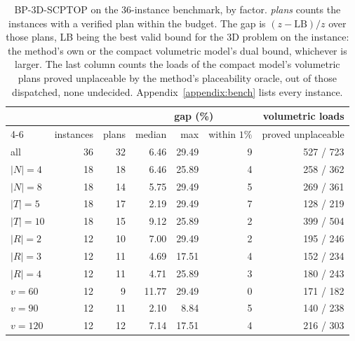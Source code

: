 \begin{table}[!htbp]
\centering
\small
\caption{BP-3D-SCPTOP on the 36-instance benchmark, by factor.
\emph{plans} counts the instances with a verified plan within the
budget. The gap is $(z-\mathrm{LB})/z$ over those plans, LB being the
best valid bound for the 3D problem on the instance: the method's own
or the compact volumetric model's dual bound, whichever is larger. The
last column counts the loads of the compact model's volumetric plans
proved unplaceable by the method's placeability oracle, out of those
dispatched, none undecided. Appendix~\ref{appendix:bench} lists every
instance.}
\label{tab:bench}
\begin{tabular}{lrrrrrr}
\toprule
 & & & \multicolumn{3}{c}{gap (\%)} & volumetric loads \\
\cmidrule(lr){4-6}
 & instances & plans & median & max & within $1\%$ & proved unplaceable \\
\midrule
all       & 36 & 32 & 6.46  & 29.49 & 9 & 527 / 723 \\
\midrule
$|N|=4$   & 18 & 18 & 6.46  & 25.89 & 4 & 258 / 362 \\
$|N|=8$   & 18 & 14 & 5.75  & 29.49 & 5 & 269 / 361 \\
$|T|=5$   & 18 & 17 & 2.19  & 29.49 & 7 & 128 / 219 \\
$|T|=10$  & 18 & 15 & 9.12  & 25.89 & 2 & 399 / 504 \\
$|R|=2$   & 12 & 10 & 7.00  & 29.49 & 2 & 195 / 246 \\
$|R|=3$   & 12 & 11 & 4.69  & 17.51 & 4 & 152 / 234 \\
$|R|=4$   & 12 & 11 & 4.71  & 25.89 & 3 & 180 / 243 \\
$v=60$    & 12 &  9 & 11.77 & 29.49 & 0 & 171 / 182 \\
$v=90$    & 12 & 11 & 2.10  & 8.84  & 5 & 140 / 238 \\
$v=120$   & 12 & 12 & 7.14  & 17.51 & 4 & 216 / 303 \\
\bottomrule
\end{tabular}
\end{table}
